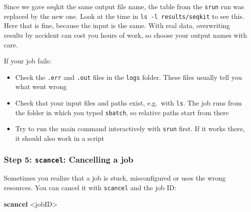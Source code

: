\documentclass[
  letterpaper,
  DIV=11,
  numbers=noendperiod]{scrreprt}
\newenvironment{Shaded}{}{}
\newcommand{\ExtensionTok}[1]{\textcolor[rgb]{0.84,0.23,0.29}{\textbf{#1}}}
\newcommand{\NormalTok}[1]{\textcolor[rgb]{0.14,0.16,0.18}{#1}}
\newcommand{\OperatorTok}[1]{\textcolor[rgb]{0.14,0.16,0.18}{#1}}
\providecommand{\tightlist}{%
  \setlength{\itemsep}{0pt}\setlength{\parskip}{0pt}}
\begin{document}
Since we gave seqkit the same output file name, the table from the
\texttt{srun} run was replaced by the new one. Look at the time in
\texttt{ls\ -l\ results/seqkit} to see this. Here that is fine, because
the input is the same. With real data, overwriting results by accident
can cost you hours of work, so choose your output names with care.

\begin{tcolorbox}[enhanced jigsaw, colbacktitle=quarto-callout-tip-color!10!white, rightrule=.15mm, leftrule=.75mm, colback=white, opacitybacktitle=0.6, title=\textcolor{quarto-callout-tip-color}{\faLightbulb}\hspace{0.5em}{Tip: Debugging your first sbatch jobs}, bottomrule=.15mm, left=2mm, colframe=quarto-callout-tip-color-frame, opacityback=0, breakable, bottomtitle=1mm, coltitle=black, arc=.35mm, toprule=.15mm, toptitle=1mm, titlerule=0mm]

If your job fails:

\begin{itemize}
\tightlist
\item
  Check the \texttt{.err} and \texttt{.out} files in the \texttt{logs}
  folder. These files usually tell you what went wrong
\item
  Check that your input files and paths exist, e.g.~with \texttt{ls}.
  The job runs from the folder in which you typed \texttt{sbatch}, so
  relative paths start from there
\item
  Try to run the main command interactively with \texttt{srun} first. If
  it works there, it should also work in a script
\end{itemize}

\end{tcolorbox}

\subsubsection{\texorpdfstring{Step 5: \texttt{scancel}: Cancelling a
job}{Step 5: scancel: Cancelling a job}}\label{step-5-scancel-cancelling-a-job}

Sometimes you realize that a job is stuck, misconfigured or uses the
wrong resources. You can cancel it with \texttt{scancel} and the job ID:

\begin{Shaded}
\begin{Highlighting}[]
\ExtensionTok{scancel} \OperatorTok{\textless{}}\NormalTok{jobID}\OperatorTok{\textgreater{}}
\end{Highlighting}
\end{Shaded}
\end{document}
